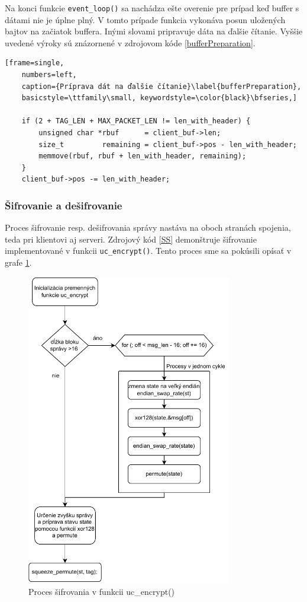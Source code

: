 Na konci funkcie \lstinline|event_loop()| sa nachádza ešte overenie pre prípad keď buffer s dátami nie je úplne plný. V tomto prípade funkcia vykonáva posun uložených bajtov na začiatok buffera. Inými slovami pripravuje dáta na ďalšie čítanie. Vyššie uvedené výroky sú znázornené v zdrojovom kóde \ref{bufferPreparation}.

\begin{lstlisting}[frame=single,
	numbers=left,
	caption={Príprava dát na ďalšie čítanie}\label{bufferPreparation},
	basicstyle=\ttfamily\small, keywordstyle=\color{black}\bfseries,]
	
	if (2 + TAG_LEN + MAX_PACKET_LEN != len_with_header) { 
		unsigned char *rbuf      = client_buf->len;
		size_t         remaining = client_buf->pos - len_with_header;
		memmove(rbuf, rbuf + len_with_header, remaining);
	}
	client_buf->pos -= len_with_header;
\end{lstlisting}
 
\subsubsection{Šifrovanie a dešifrovanie}
Proces šifrovanie resp. dešifrovania správy nastáva na oboch stranách spojenia, teda pri klientovi aj serveri. Zdrojový kód \ref{SS} demonštruje šifrovanie implementované v funkcii \lstinline|uc_encrypt()|. Tento proces sme sa pokúsili opísať v grafe \ref{fc3}. 

\begin{figure}
	\centering
	\includegraphics[width=0.8\textwidth]{figures/fc3}
	\caption{Proces šifrovania v funkcii uc\_encrypt()}
	\label{fc3}
\end{figure}

